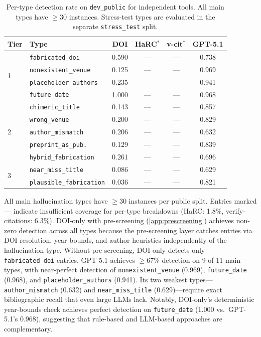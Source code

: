 \begin{table}[t]
\caption{Per-type detection rate on \texttt{dev\_public} for independent tools. All main types have $\geq$30 instances. Stress-test types are evaluated in the separate \texttt{stress\_test} split.}
\label{tab:pertype_full}
\centering
\small
\setlength{\tabcolsep}{3pt}
\begin{tabular}{llcccc}
\toprule
\textbf{Tier} & \textbf{Type} & \textbf{DOI} & \textbf{HaRC$^*$} & \textbf{v-cit$^*$} & \textbf{GPT-5.1} \\
\midrule
\multirow{4}{*}{1}
& \texttt{fabricated\_doi}        & 0.590 & --- & --- & 0.738 \\
& \texttt{nonexistent\_venue}     & 0.125 & --- & --- & 0.969 \\
& \texttt{placeholder\_authors}   & 0.235 & --- & --- & 0.941 \\
& \texttt{future\_date}           & 1.000 & --- & --- & 0.968 \\
\midrule
\multirow{5}{*}{2}
& \texttt{chimeric\_title}        & 0.143 & --- & --- & 0.857 \\
& \texttt{wrong\_venue}           & 0.200 & --- & --- & 0.829 \\
& \texttt{author\_mismatch}       & 0.206 & --- & --- & 0.632 \\
& \texttt{preprint\_as\_pub.}     & 0.129 & --- & --- & 0.839 \\
& \texttt{hybrid\_fabrication}    & 0.261 & --- & --- & 0.696 \\
\midrule
\multirow{2}{*}{3}
& \texttt{near\_miss\_title}      & 0.086 & --- & --- & 0.629 \\
& \texttt{plausible\_fabrication} & 0.036 & --- & --- & 0.821 \\
\bottomrule
\end{tabular}
\end{table}

\noindent All main hallucination types have $\geq$30 instances per public split.
Entries marked --- indicate insufficient coverage for per-type breakdowns (HaRC: 1.8\%, verify-citations: 6.3\%).
DOI-only with pre-screening (\cref{app:prescreening}) achieves non-zero detection across all types because the pre-screening layer catches entries via DOI resolution, year bounds, and author heuristics independently of the hallucination type.
Without pre-screening, DOI-only detects only \texttt{fabricated\_doi} entries.
GPT-5.1 achieves ${\geq}67\%$ detection on 9 of 11 main types, with near-perfect detection of \texttt{nonexistent\_venue} (0.969), \texttt{future\_date} (0.968), and \texttt{placeholder\_authors} (0.941).
Its two weakest types---\texttt{author\_mismatch} (0.632) and \texttt{near\_miss\_title} (0.629)---require exact bibliographic recall that even large LLMs lack.
Notably, DOI-only's deterministic year-bounds check achieves perfect detection on \texttt{future\_date} (1.000 vs.\ GPT-5.1's 0.968), suggesting that rule-based and LLM-based approaches are complementary.

